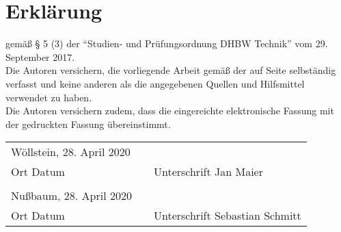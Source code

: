  \section*{Erklärung}

gemäß § 5 (3) der \enquote{Studien- und Prüfungsordnung DHBW Technik} vom 29. September 2017.\\

Die Autoren versichern, die vorliegende Arbeit gemäß der  auf Seite \pageref{sec:authors} selbständig verfasst und keine anderen als die angegebenen Quellen und Hilfsmittel verwendet zu haben. \\

Die Autoren versichern zudem, dass die eingereichte elektronische Fassung mit der gedruckten Fassung übereinstimmt. \\



\begin{table}[h]
\begin{tabularx}{\textwidth}{XlX}
Wöllstein, 28. April 2020 &  &                        \\ \cline{1-1} \cline{3-3} 
Ort Datum                 &  & Unterschrift Jan Maier \\
& &  \\
Nußbaum, 28. April 2020 &  &                        \\ \cline{1-1} \cline{3-3} 
Ort Datum                 &  & Unterschrift Sebastian Schmitt
\end{tabularx}
\end{table}